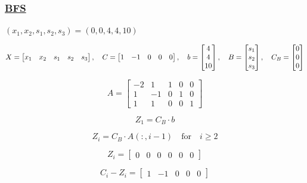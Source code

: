 \vspace{1.5cm}


\subsubsection*{\underline{BFS}}
\((x_1,x_2,s_1,s_2,s_3) = (0,0,4,4,10)\)

\[
    X = \left[\begin{matrix} x_1 & x_2 & s_1 & s_2 & s_3 \end{matrix}\right], \hspace{0.35cm}
    C = \left[\begin{matrix} 1 & -1 & 0 & 0 & 0 \end{matrix}\right], \hspace{0.35cm}
b = \left[\begin{matrix} 4 \\ 4 \\ 10 \end{matrix}\right], \hspace{0.35cm}
B = \left[\begin{matrix} s_1 \\ s_2 \\ s_3 \end{matrix}\right], \hspace{0.35cm}
C_B = \left[\begin{matrix} 0 \\ 0 \\ 0 \end{matrix}\right]
\]


\vspace{1cm}
\[
    A = \left[\begin{matrix} -2 & 1 & 1 & 0 & 0\\
                             1 & -1 & 0 & 1 & 0\\
                             1 & 1 & 0 & 0 & 1\end{matrix}\right]
\]


\vspace{0.75cm}
\[Z_1 = C_B \cdot b\] 


\[Z_i = C_B \cdot A(:, i-1) \quad \text{for} \quad i \geq 2\] 

\[Z_i = \left[\begin{matrix} 0 & 0 & 0 & 0 & 0 & 0 \end{matrix}\right]\]

\vspace{0.5cm}

\[C_i-Z_i = \left[\begin{matrix} 1  & -1 & 0  & 0  & 0  \end{matrix}\right]\]

